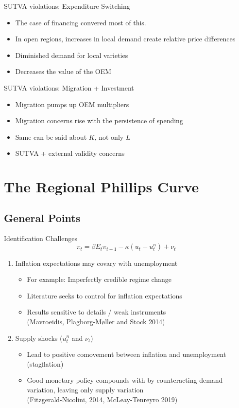 \documentclass[english,xcolor=svgnames]{beamer}
\begin{document}
\begin{frame}{SUTVA violations: Expenditure Switching}
\begin{itemize}
\item The case of financing convered most of this.
\item In open regions, increases in local demand create relative price differences
\item Diminished demand for local varieties
\item Decreases the value of the OEM
\end{itemize}
\end{frame}

\begin{frame}{SUTVA violations: Migration + Investment}
\begin{itemize}
\item Migration pumps up OEM multipliers
\item Migration concerns rise with the persistence of spending
\item Same can be said about $K$, not only $L$
\item SUTVA + external validity concerns
\end{itemize}
\end{frame}

\section{The Regional Phillips Curve}

\subsection{General Points}

\begin{frame}{Identification Challenges}
	\[ \pi_{t} = \beta E_{t} \pi_{t+1} - \kappa (u_{t} - u_{t}^{n} ) + \nu_{t} \] \vspace{-10pt}
	\begin{enumerate}
		\itemsep1em 
		\item Inflation expectations may covary with unemployment
		\begin{itemize}
			\item For example: Imperfectly credible regime change
			\item Literature seeks to control for inflation expectations
			\item Results sensitive to details / weak instruments \\ (Mavroeidis, Plagborg-Møller and Stock 2014) 
		\end{itemize}
		\item Supply shocks ($u^n_t$ and $\nu_t$)
		\begin{itemize}
			\item Lead to positive comovement between inflation and unemployment (stagflation)
			\item Good monetary policy compounds with by counteracting demand variation, leaving only supply variation \\ (Fitzgerald-Nicolini, 2014, McLeay-Tenreyro 2019)
		\end{itemize}
	\end{enumerate}
\end{frame}
\end{document}
